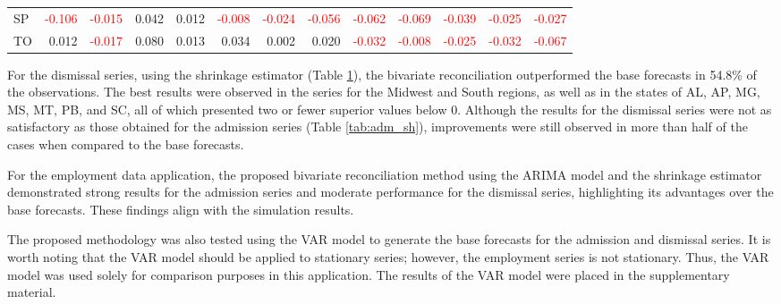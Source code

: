 \documentclass[a4paper,preprint,11pt,authoryear]{elsarticle}
\DeclareMathOperator{\RelRMSE}{RelRMSE}
\DeclareMathOperator{\Base}{Base}
\begin{document}
\begin{table}
{\begin{tabular}{lrrrrrrrrrrrr}
      SP & \textcolor{red}{-0.106} & \textcolor{red}{-0.015} & 0.042 & 0.012 & \textcolor{red}{-0.008} & \textcolor{red}{-0.024} & \textcolor{red}{-0.056} & \textcolor{red}{-0.062} & \textcolor{red}{-0.069} & \textcolor{red}{-0.039} & \textcolor{red}{-0.025} & \textcolor{red}{-0.027} \\
      TO & 0.012 & \textcolor{red}{-0.017} & 0.080 & 0.013 & 0.034 & 0.002 & 0.020 & \textcolor{red}{-0.032} & \textcolor{red}{-0.008} & \textcolor{red}{-0.025} & \textcolor{red}{-0.032} & \textcolor{red}{-0.067} \\
      \hline
    \end{tabular}%
  }
  \label{tab:dem_sh}
\end{table}

For the dismissal series, using the shrinkage estimator (Table \ref{tab:dem_sh}), the bivariate reconciliation outperformed the base forecasts in 54.8\% of the observations. The best results were observed in the series for the Midwest and South regions, as well as in the states of AL, AP, MG, MS, MT, PB, and SC, all of which presented two or fewer superior values below 0. Although the results for the dismissal series were not as satisfactory as those obtained for the admission series (Table \ref{tab:adm_sh}), improvements were still observed in more than half of the cases when compared to the base forecasts.

For the employment data application, the proposed bivariate reconciliation method using the ARIMA model and the shrinkage estimator demonstrated strong results for the admission series and moderate performance for the dismissal series, highlighting its advantages over the base forecasts. These findings align with the simulation results.

The proposed methodology was also tested using the VAR model to generate the base forecasts for the admission and dismissal series. It is worth noting that the VAR model should be applied to stationary series; however, the employment series is not stationary. Thus, the VAR model was used solely for comparison purposes in this application. The results of the VAR model were placed in the supplementary material. 

\end{document}
